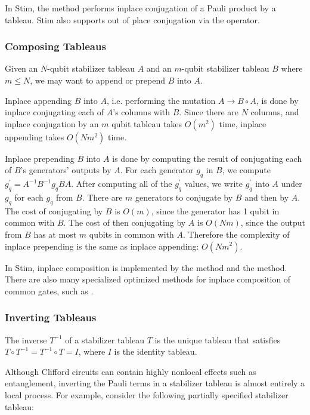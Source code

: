 \documentclass[onecolumn,unpublished]{quantumarticle}
\theoremstyle{definition}
\theoremstyle{definition}
\theoremstyle{definition}
\begin{document}
In Stim, the method  performs inplace conjugation of a Pauli product by a tableau.
Stim also supports out of place conjugation via the  operator.

\subsubsection{Composing Tableaus}

Given an $N$-qubit stabilizer tableau $A$ and an $m$-qubit stabilizer tableau $B$ where $m \leq N$, we may want to append or prepend $B$ into $A$.

Inplace appending $B$ into $A$, i.e. performing the mutation $A \rightarrow B \circ A$, is done by inplace conjugating each of $A$'s columns with $B$.
Since there are $N$ columns, and inplace conjugation by an $m$ qubit tableau takes $O(m^2)$ time, inplace appending takes $O(N m^2)$ time.

Inplace prepending $B$ into $A$ is done by computing the result of conjugating each of $B$'s generators' outputs by $A$.
For each generator $g_q$ in $B$, we compute $g_q^\prime = A^{-1} B^{-1} g_q B A$.
After computing all of the $g_q^\prime$ values, we write $g_q^\prime$ into $A$ under $g_q$ for each $g_q$ from $B$.
There are $m$ generators to conjugate by $B$ and then by $A$.
The cost of conjugating by $B$ is $O(m)$, since the generator has 1 qubit in common with $B$.
The cost of then conjugating by $A$ is $O(Nm)$, since the output from $B$ has at most $m$ qubits in common with $A$.
Therefore the complexity of inplace prepending is the same as inplace appending: $O(N m^2)$.

In Stim, inplace composition is implemented by the  method and the  method.
There are also many specialized optimized methods for inplace composition of common gates, such as .

\subsubsection{Inverting Tableaus}

The inverse $T^{-1}$ of a stabilizer tableau $T$ is the unique tableau that satisfies $T \circ T^{-1} = T^{-1} \circ T = I$, where $I$ is the identity tableau.

Although Clifford circuits can contain highly nonlocal effects such as entanglement, inverting the Pauli terms in a stabilizer tableau is almost entirely a local process.
For example, consider the following partially specified stabilizer tableau:
\end{document}
